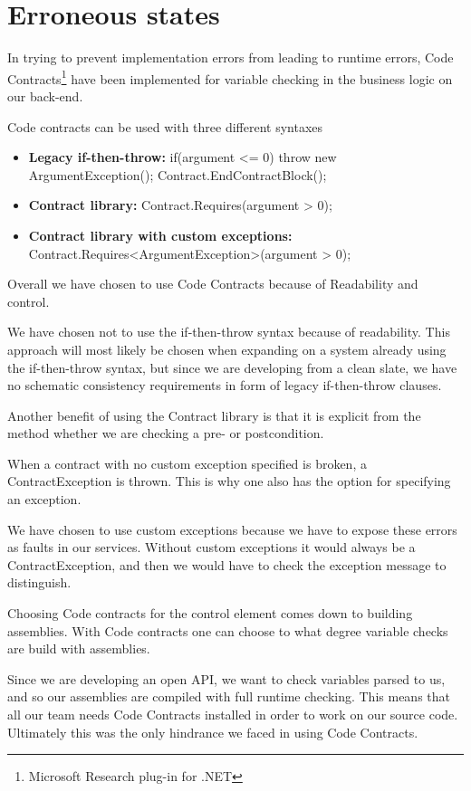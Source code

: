 \documentclass[../report.tex]{subfiles}
\begin{document}
\section{Erroneous states}

In trying to prevent implementation errors from leading to runtime errors, Code Contracts\footnote{Microsoft Research plug-in for .NET} have been implemented for variable checking in the business logic on our back-end.

Code contracts can be used with three different syntaxes

\begin{itemize}
\item \textbf{Legacy if-then-throw:}
\subitem if(argument <= 0) throw new ArgumentException();  
\subitem Contract.EndContractBlock();

\item \textbf{Contract library:}
\subitem Contract.Requires(argument > 0);

\item \textbf{Contract library with custom exceptions:}
\subitem Contract.Requires<ArgumentException>(argument > 0);
\end{itemize}

Overall we have chosen to use Code Contracts because of Readability and control.

We have chosen not to use the if-then-throw syntax because of readability. This approach will most likely be chosen when expanding on a system already using the if-then-throw syntax, but since we are developing from a clean slate, we have no schematic consistency requirements in form of legacy if-then-throw clauses.

Another benefit of using the Contract library is that it is explicit from the method whether we are checking a pre- or postcondition.

When a contract with no custom exception specified is broken, a ContractException is thrown. This is why one also has the option for specifying an exception.

We have chosen to use custom exceptions because we have to expose these errors as faults in our services. Without custom exceptions it would always be a ContractException, and then we would have to check the exception message to distinguish.

Choosing Code contracts for the control element comes down to building assemblies. With Code contracts one can choose to what degree variable checks are build with assemblies.

Since we are developing an open API, we want to check variables parsed to us, and so our assemblies are compiled with full runtime checking. This means that all our team needs Code Contracts installed in order to work on our source code. Ultimately this was the only hindrance we faced in using Code Contracts.
\end{document}
